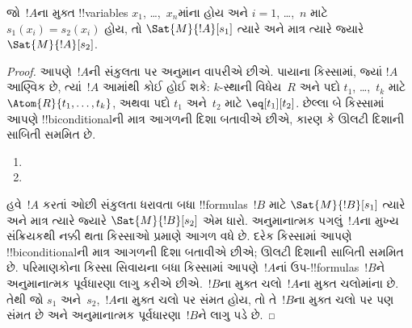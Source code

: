 \documentclass[../../../include/open-logic-section]{subfiles}
\begin{document}
\begin{prop}
જો~$!A$ના મુક્ત !!{variable}s $x_1$, \dots,~$x_n$માંના હોય અને
$i=1$, \dots,~$n$ માટે $s_1(x_i)=s_2(x_i)$ હોય, તો
$\Sat{M}{!A}[s_1]$ ત્યારે અને માત્ર ત્યારે જ્યારે
$\Sat{M}{!A}[s_2]$.
\end{prop}

\begin{proof}
આપણે~$!A$ની સંકુલતા પર અનુમાન વાપરીએ છીએ. પાયાના કિસ્સામાં, જ્યાં
$!A$ આણ્વિક છે, ત્યાં~$!A$ આમાંથી કોઈ હોઈ શકે:
$k$-સ્થાની વિધેય~$R$ અને પદો $t_1$, \dots,~$t_k$ માટે
$\Atom{R}{t_1,\dots,t_k}$, અથવા પદો $t_1$ અને~$t_2$ માટે
$\eq[t_1][t_2]$. છેલ્લા બે કિસ્સામાં આપણે !!{biconditional}ની માત્ર આગળની દિશા
બતાવીએ છીએ, કારણ કે ઊલટી દિશાની સાબિતી સમમિત છે.

\begin{enumerate}


\item
\item
\end{enumerate}

હવે~$!A$ કરતાં ઓછી સંકુલતા ધરાવતા બધા !!{formula}s~$!B$ માટે
$\Sat{M}{!B}[s_1]$ ત્યારે અને માત્ર ત્યારે જ્યારે $\Sat{M}{!B}[s_2]$
એમ ધારો. અનુમાનાત્મક પગલું~$!A$ના મુખ્ય સંક્રિયકથી નક્કી થતા કિસ્સાઓ
પ્રમાણે આગળ વધે છે. દરેક કિસ્સામાં આપણે !!{biconditional}ની માત્ર આગળની દિશા
બતાવીએ છીએ; ઊલટી દિશાની સાબિતી સમમિત છે. પરિમાણકોના કિસ્સા સિવાયના
બધા કિસ્સામાં આપણે~$!A$નાં ઉપ-!!{formula}s~$!B$ને અનુમાનાત્મક
પૂર્વધારણા લાગુ કરીએ છીએ.~$!B$ના મુક્ત ચલો~$!A$ના મુક્ત ચલોમાંના છે.
તેથી જો $s_1$ અને~$s_2$,~$!A$ના મુક્ત ચલો પર સંમત હોય, તો તે~$!B$ના
મુક્ત ચલો પર પણ સંમત છે અને અનુમાનાત્મક પૂર્વધારણા~$!B$ને લાગુ પડે છે.


\end{proof}
\end{document}

